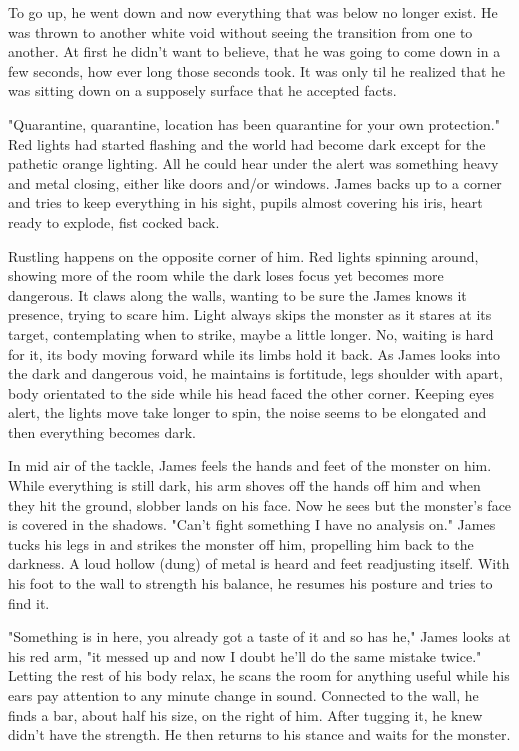         To go up, he went down and now everything that was below no longer exist. He was thrown to another white void without seeing the 
    transition from one to another. At first he didn't want to believe, that he was going to come down in a few seconds, how ever long those
    seconds took. It was only til he realized that he was sitting down on a supposely surface that he accepted facts. 

        "Quarantine, quarantine, location has been quarantine for your own protection." Red lights had started flashing and the world had become
    dark except for the pathetic orange lighting. All he could hear under the alert was something heavy and metal closing, either like doors
    and/or windows. James backs up to a corner and tries to keep everything in his sight, pupils almost covering his iris, heart ready to explode,
    fist cocked back.

        Rustling happens on the opposite corner of him. Red lights spinning around, showing more of the room while the dark loses focus yet
    becomes more dangerous. It claws along the walls, wanting to be sure the James knows it presence, trying to scare him. Light always skips
    the monster as it stares at its target, contemplating when to strike, maybe a little longer. No, waiting is hard for it, its body moving
    forward while its limbs hold it back. As James looks into the dark and dangerous void, he maintains is fortitude, legs shoulder with apart,
    body orientated to the side while his head faced the other corner. Keeping eyes alert, the lights move take longer to spin, the noise
    seems to be elongated and then everything becomes dark.

        In mid air of the tackle, James feels the hands and feet of the monster on him. While everything is still dark, his arm shoves off
    the hands off him and when they hit the ground, slobber lands on his face. Now he sees but the monster's face is covered in the shadows.
    "Can't fight something I have no analysis on." James tucks his legs in and strikes the monster off him, propelling him back to the darkness.
    A loud hollow (dung) of metal is heard and feet readjusting itself. With his foot to the wall to strength his balance, he resumes his posture
    and tries to find it.

        "Something is in here, you already got a taste of it and so has he," James looks at his red arm, "it messed up and now I doubt he'll do
    the same mistake twice." Letting the rest of his body relax, he scans the room for anything useful while his ears pay attention to any minute
    change in sound. Connected to the wall, he finds a bar, about half his size, on the right of him. After tugging it, he knew didn't have the 
    strength. He then returns to his stance and waits for the monster.


